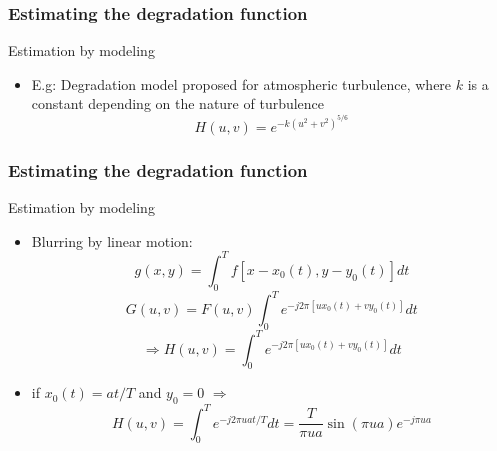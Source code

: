 \documentclass{beamer}
\begin{document}
\begin{frame}
\frametitle{Estimating the degradation function}
\begin{block}{Estimation by modeling}
\scriptsize{
\begin{itemize}
	\item E.g: Degradation model proposed for atmospheric turbulence, where $k$ is a constant depending on the nature of turbulence 
	$$H(u,v) = e^{-k(u^2+v^2)^{5/6}}$$
	\noindent
	\end{itemize}
}
\end{block}
\end{frame}
\begin{frame}
\frametitle{Estimating the degradation function}
\begin{block}{Estimation by modeling}

\begin{itemize}
	\item Blurring by linear motion:  
	$$g(x,y) = \int^{T}_{0} f[x-x_{0}(t), y-y_{0}(t)] dt$$
	$$G(u,v) = F(u,v)\int^{T}_{0} e^{-j2\pi[ux_{0}(t)+vy_{0}(t)]} dt$$
	$$ \Rightarrow H(u,v) = \int^{T}_{0} e^{-j2\pi[ux_{0}(t)+vy_{0}(t)]} dt$$ 
	\item if $x_{0}(t) = at/T$ and $y_{0} = 0$ $\Rightarrow$
	$$H(u,v) = \int^{T}_{0} e^{-j2\pi uat/T} dt = \frac{T}{\pi ua} \sin(\pi ua) e^{-j\pi ua}  $$
	\end{itemize}
		
\end{block}
\end{frame}
\end{document}
